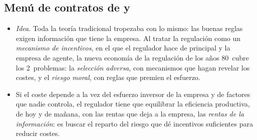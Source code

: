 \documentclass[11pt]{article}
\begin{document}
\subsection{Menú de contratos de  y }\label{anexo:laffont-tirole}

\begin{itemize}
\item \emph{Idea}. Toda la teoría tradicional tropezaba con lo mismo: las buenas reglas exigen información que tiene la empresa. Al tratar la regulación como un \emph{mecanismo de incentivos}, en el que el regulador hace de principal y la empresa de agente, la nueva economía de la regulación de los años 80~cubre los 2~problemas: la \emph{selección adversa}, con mecanismos que hagan revelar los costes, y el \emph{riesgo moral}, con reglas que premien el esfuerzo.
\item Si el coste depende a la vez del esfuerzo inversor de la empresa y de factores que nadie controla, el regulador tiene que equilibrar la eficiencia productiva, de hoy y de mañana, con las rentas que deja a la empresa, las \emph{rentas de la información}: es buscar el reparto del riesgo que dé incentivos suficientes para reducir costes.
\end{itemize}
\end{document}
